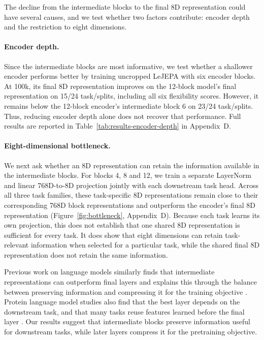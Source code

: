 \documentclass{article}
\begin{document}
The decline from the intermediate blocks to the final 8D representation could have several causes, and we test whether two factors contribute: encoder depth and the restriction to eight dimensions.

\paragraph{Encoder depth.}
Since the intermediate blocks are most informative, we test whether a shallower encoder performs better by training uncropped LeJEPA with six encoder blocks. At 100k, its final 8D representation improves on the 12-block model's final representation on 15/24 task/splits, including all six flexibility scores. However, it remains below the 12-block encoder's intermediate block 6 on 23/24 task/splits. Thus, reducing encoder depth alone does not recover that performance. Full results are reported in Table~\ref{tab:results-encoder-depth} in Appendix~D.

\paragraph{Eight-dimensional bottleneck.}
We next ask whether an 8D representation can retain the information available in the intermediate blocks. For blocks 4, 8 and 12, we train a separate LayerNorm and linear 768D-to-8D projection jointly with each downstream task head. Across all three task families, these task-specific 8D representations remain close to their corresponding 768D block representations and outperform the encoder's final 8D representation (Figure~\ref{fig:bottleneck}, Appendix~D). Because each task learns its own projection, this does not establish that one shared 8D representation is sufficient for every task. It does show that eight dimensions can retain task-relevant information when selected for a particular task, while the shared final 8D representation does not retain the same information.

Previous work on language models similarly finds that intermediate representations can outperform final layers and explains this through the balance between preserving information and compressing it for the training objective \citep{skean2025layer}. Protein language model studies also find that the best layer depends on the downstream task, and that many tasks reuse features learned before the final layer \citep{li2024featurereuse,joeres2026taskdataset}. Our results suggest that intermediate blocks preserve information useful for downstream tasks, while later layers compress it for the pretraining objective.
\end{document}
